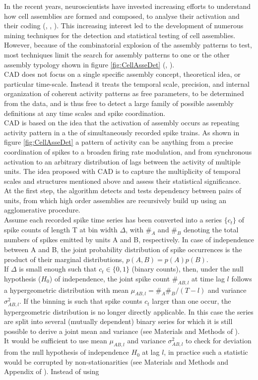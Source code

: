 \begin{framed}
In the recent years, neuroscientists have invested increasing efforts to understand how cell assemblies are formed and composed, to analyse their activation and their coding (\cite{Buzsaki1}, \cite{Liu}, \cite{Cai}). This increasing interest led to the development of numerous mining techniques for the detection and statistical testing of cell assemblies. However, because of the combinatorial explosion of the assembly patterns to test, most techniques limit the search for assembly patterns to one or the other assembly typology shown in figure \ref{fig:CellAsseDet} (\cite{Torre}, \cite{Tavoni}).\\CAD does not focus on a single specific assembly concept, theoretical idea, or particular time-scale. Instead it treats the temporal scale, precision, and internal organization of coherent activity patterns as free parameters, to be determined from the data, and is thus free to detect a large family of possible assembly definitions at any time scales and spike coordination.\\CAD is based on the idea that the activation of assembly occurs as repeating activity pattern in a the of simultaneously recorded spike trains. As shown in figure \ref{fig:CellAsseDet} a pattern of activity can be anything from a precise coordination of spikes to a broaden firing rate modulation, and from synchronous activation to an arbitrary distribution of lags between the activity of multiple units. The idea proposed with CAD is to capture the multiplicity of temporal scales and structures mentioned above and assess their statistical significance.\\At the first step, the algorithm detects and tests dependency between pairs of units, from which high order assemblies are recursively build up using an agglomerative procedure.\\Assume each recorded spike time series has been converted into a series $\{c_t\}$ of spike counts of length T at bin width $\Delta$, with $\#_A$ and $\#_B$ denoting the total numbers of spikes emitted by units A and B, respectively. In case of independence between A and B, the joint probability distribution of spike occurrences is the product of their marginal distributions, $p(A,B)=p(A)p(B)$.\\  If $\Delta$ is small enough such that $c_t\in\{0,1\}$ (binary counts), then, under the null hypothesis ($H_0$) of independence, the joint spike count $\#_{AB,l}$ at time lag $l$ follows a hypergeometric distribution with mean $\mu_{AB,l}=\#_A \#_B/(T-l)$ and variance $\sigma^{2}_{AB,l}$. If the binning is such that spike counts $c_t$ larger than one occur, the hypergeometric distribution is no longer directly applicable. In this case the series are split into several (mutually dependent) binary series for which it is still possible to derive a joint mean and variance (see Materials and Methods of ).\\It would be sufficient to use mean $\mu_{AB,l}$ and variance $\sigma^{2}_{AB,l}$ to check for deviation from the null hypothesis of independence $H_0$ at lag $l$, in practice such a statistic would be corrupted by non-stationarities (see Materials and Methods and Appendix of \cite{RussoDurstewitz}). Instead of using 
\end{framed}
